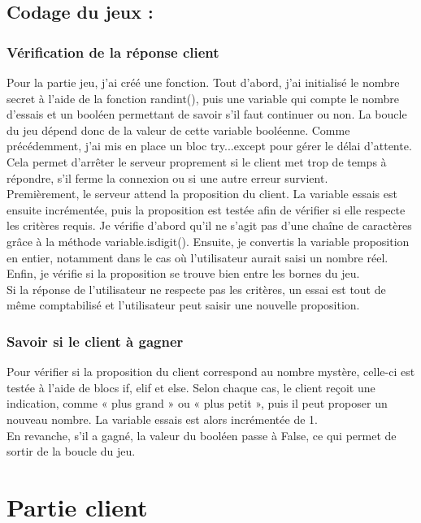 \documentclass[12pt,a4paper]{article}
\begin{document}
\subsection{Codage du jeux :}
\subsubsection{Vérification de la réponse client}
Pour la partie jeu, j’ai créé une fonction. Tout d’abord, j’ai initialisé le nombre secret à l’aide de la fonction randint(), puis une variable qui compte le nombre d’essais et un booléen permettant de savoir s’il faut continuer ou non. La boucle du jeu dépend donc de la valeur de cette variable booléenne.
Comme précédemment, j’ai mis en place un bloc try...except pour gérer le délai d’attente. Cela permet d’arrêter le serveur proprement si le client met trop de temps à répondre, s’il ferme la connexion ou si une autre erreur survient.\\
Premièrement, le serveur attend la proposition du client. La variable essais est ensuite incrémentée, puis la proposition est testée afin de vérifier si elle respecte les critères requis. Je vérifie d’abord qu’il ne s’agit pas d’une chaîne de caractères grâce à la méthode variable.isdigit(). Ensuite, je convertis la variable proposition en entier, notamment dans le cas où l’utilisateur aurait saisi un nombre réel. Enfin, je vérifie si la proposition se trouve bien entre les bornes du jeu.\\
Si la réponse de l’utilisateur ne respecte pas les critères, un essai est tout de même comptabilisé et l’utilisateur peut saisir une nouvelle proposition.

\subsubsection{Savoir si le client à gagner}
Pour vérifier si la proposition du client correspond au nombre mystère, celle-ci est testée à l’aide de blocs if, elif et else. Selon chaque cas, le client reçoit une indication, comme « plus grand » ou « plus petit », puis il peut proposer un nouveau nombre. La variable essais est alors incrémentée de 1.\\
En revanche, s’il a gagné, la valeur du booléen passe à False, ce qui permet de sortir de la boucle du jeu.

\section{Partie client}
\end{document}
